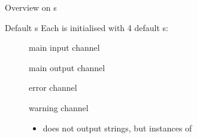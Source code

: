 \documentclass[handout]{beamer}
\begin{document}
\begin{frame}[allowframebreaks]{Overview on s}
    \begin{block}{Default s}
        Each  is initialised with 4 default s:
        \begin{description}
            \item[] main input channel
            \item[] main output channel
            \item[] error channel
            \item[] warning channel
            \begin{itemize}
                \item does not output strings, but instances of 
            \end{itemize}
        \end{description}
    \end{block}
\end{frame}
\end{document}
